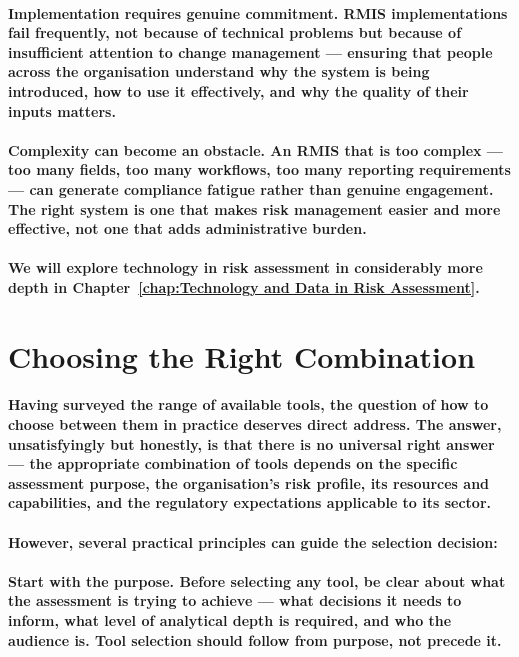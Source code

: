\paragraph{\textbf{Implementation requires genuine commitment}. RMIS implementations fail frequently, not because of technical problems but because of insufficient attention to change management — ensuring that people across the organisation understand why the system is being introduced, how to use it effectively, and why the quality of their inputs matters.}
\paragraph{\textbf{Complexity can become an obstacle}. An RMIS that is too complex — too many fields, too many workflows, too many reporting requirements — can generate compliance fatigue rather than genuine engagement. The right system is one that makes risk management easier and more effective, not one that adds administrative burden.}
\paragraph{We will explore technology in risk assessment in considerably more depth in Chapter~\ref{chap:Technology and Data in Risk Assessment}.}

\section{Choosing the Right Combination}
\paragraph{Having surveyed the range of available tools, the question of how to choose between them in practice deserves direct address. The answer, unsatisfyingly but honestly, is that there is no universal right answer — the appropriate combination of tools depends on the specific assessment purpose, the organisation's risk profile, its resources and capabilities, and the regulatory expectations applicable to its sector.}
\paragraph{However, several practical principles can guide the selection decision:}
\paragraph{\textbf{Start with the purpose}. Before selecting any tool, be clear about what the assessment is trying to achieve — what decisions it needs to inform, what level of analytical depth is required, and who the audience is. Tool selection should follow from purpose, not precede it.}
